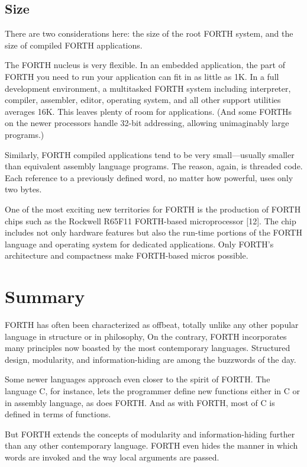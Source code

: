 \subsection*{Size}

There are two considerations here: the size of the root FORTH system,
and the size of compiled FORTH applications.

The FORTH nucleus is very flexible. In an embedded application, the
part of FORTH you need to run your application can fit in as little
as 1K. In a full development environment, a multitasked FORTH system
including interpreter, compiler, assembler, editor, operating system,
and all other support utilities averages 16K. This leaves plenty of
room for applications. (And some FORTHs on the newer processors handle
32-bit addressing, allowing unimaginably large programs.)

Similarly, FORTH compiled applications tend to be very small---usually
smaller than equivalent assembly language programs. The reason, again,
is threaded code. Each reference to a previously defined word, no
matter how powerful, uses only two bytes.

One of the most exciting new territories for FORTH is the production
of FORTH chips such as the Rockwell R65F11 FORTH-based microprocessor
{[}12{]}. The chip includes not only hardware features but also the
run-time portions of the FORTH language and operating system for dedicated
applications. Only FORTH's architecture and compactness make FORTH-based
micros possible.


\section*{Summary}

FORTH has often been characterized as offbeat, totally unlike any
other popular language in structure or in philosophy, On the contrary,
FORTH incorporates many principles now boasted by the most contemporary
languages. Structured design, modularity, and information-hiding are
among the buzzwords of the day.

Some newer languages approach even closer to the spirit of FORTH.
The language C, for instance, lets the programmer define new functions
either in C or in assembly language, as does FORTH. And as with FORTH,
most of C is defined in terms of functions.

But FORTH extends the concepts of modularity and information-hiding
further than any other contemporary language. FORTH even hides the
manner in which words are invoked and the way local arguments are
passed.

